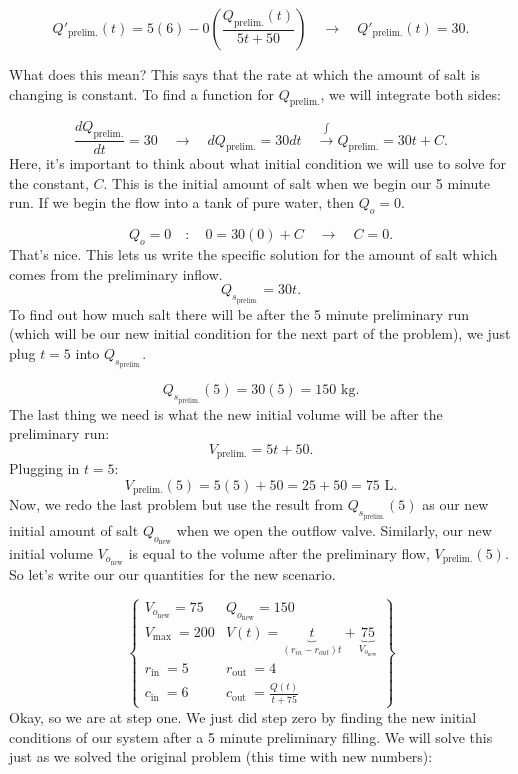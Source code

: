\documentclass[a4paper,12pt]{article}
\begin{document}
$$ Q'_{\text{prelim.}}(t) = 5(6) - 0\left(\frac{Q_{\text{prelim.}}(t)}{5t + 50}\right) \quad\rightarrow\quad Q'_{\text{prelim.}}(t) = 30 . $$

What does this mean? This says that the rate at which the amount of salt is changing is constant. To find a function for $Q_{\text{prelim.}}$, we will integrate both sides:

$$ \frac{dQ_{\text{prelim.}}}{dt} = 30 \quad\rightarrow\quad dQ_{\text{prelim.}} = 30dt \quad\overset{\int}\rightarrow Q_{\text{prelim.}} = 30t + C. $$
Here, it's important to think about what initial condition we will use to solve for the constant, $C$. This is the initial amount of salt when we begin our 5 minute run. If we begin the flow into a tank of pure water, then $Q_{o}=0$.

$$ Q_o = 0 \quad:\quad 0 = 30 (0) + C \quad\rightarrow\quad C = 0. $$
That's nice. This lets us write the specific solution for the amount of salt which comes from the preliminary inflow.
$$
Q_{s_{\text{prelim.}}} = 30t.
$$
To find out how much salt there will be after the 5 minute preliminary run (which will be our new initial condition for the next part of the problem), we just plug $t=5$ into $Q_{s_{\text{prelim.}}}.$

$$ Q_{s_{\text{prelim.}}}(5) = 30(5) = 150 \text{ kg}. $$
The last thing we need is what the new initial volume will be after the preliminary run:
$$ V_{\text{prelim.}} = 5t + 50. $$
Plugging in $t=5$:
$$ V_{\text{prelim.}}(5) = 5(5) + 50 = 25 + 50 = 75 \text{ L}. $$
Now, we redo the last problem but use the result from $Q_{s_{\text{prelim.}}}(5)$ as our new initial amount of salt $Q_{o_{\text{new}}}$ when we open the outflow valve. Similarly, our new initial volume $V_{o_{\text{new}}}$ is equal to the volume after the preliminary flow, $V_{\text{prelim.}}(5)$. So let's write our our quantities for the new scenario.

$$
\left\{
\begin{array}{ll}
V_{o_{\text{new}}}=75 & Q_{o_{\text{new}}}=150 \\
V_{\text {max }}=200 & V(t)=\underbrace{t}_{(r_{in} - r_{out})t} +\underbrace{75}_{V_{o_{\text{new}}}} \\
r_{\text {in }}=5 & r_{\text {out }}=4 \\
c_{\text {in }}=6 & c_{\text {out }}=\frac{Q(t)}{t+75}
\end{array}
\right\}
$$
Okay, so we are at step one. We just did step zero by finding the new initial conditions of our system after a 5 minute preliminary filling. We will solve this just as we solved the original problem (this time with new numbers):
\end{document}
